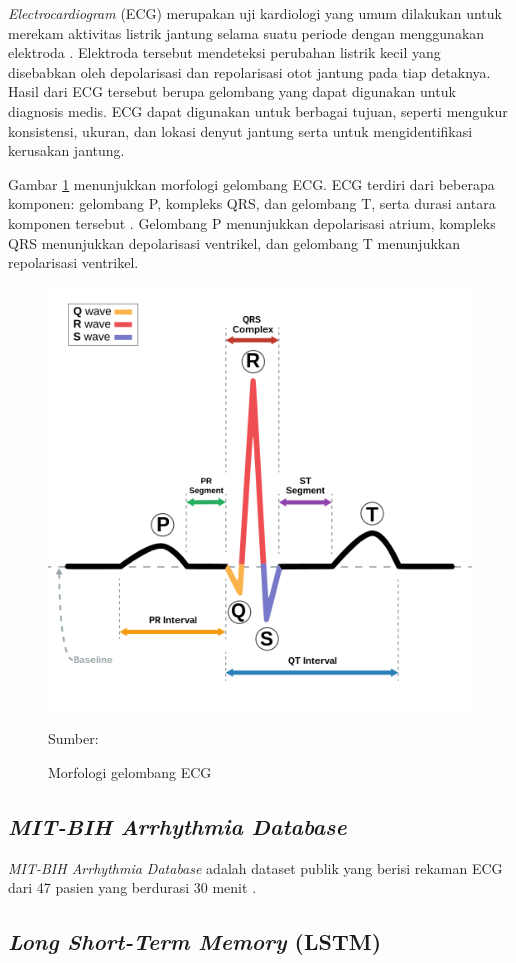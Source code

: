 \textit{Electrocardiogram} (ECG) merupakan uji kardiologi yang umum dilakukan untuk merekam aktivitas listrik jantung selama suatu periode dengan menggunakan elektroda \parencite{yoonDeepLearningbasedElectrocardiogram2019}.
Elektroda tersebut mendeteksi perubahan listrik kecil yang disebabkan oleh depolarisasi dan repolarisasi otot jantung pada tiap detaknya.
Hasil dari ECG tersebut berupa gelombang yang dapat digunakan untuk diagnosis medis.
ECG dapat digunakan untuk berbagai tujuan, seperti mengukur konsistensi, ukuran, dan lokasi denyut jantung serta untuk mengidentifikasi kerusakan jantung.


Gambar \ref{fig: ecg-morphology} menunjukkan morfologi gelombang ECG. ECG terdiri dari beberapa komponen: gelombang P, kompleks QRS, dan gelombang T, serta durasi antara komponen tersebut \parencite{anbalaganAnalysisVariousTechniques2023}.  Gelombang P menunjukkan depolarisasi atrium, kompleks QRS menunjukkan depolarisasi ventrikel, dan gelombang T menunjukkan repolarisasi ventrikel.

\begin{figure}[H]
  \centering
  \includegraphics[width=.5\linewidth]{img/ecg-morphology.png}
  \caption{Morfologi gelombang ECG}
  Sumber: \textcite{wiki:xxx}
  \label{fig: ecg-morphology}
\end{figure}

\subsection{\textit{MIT-BIH Arrhythmia Database}}
\label{subsec: landasan-mitbih}

\textit{MIT-BIH Arrhythmia Database} adalah dataset publik yang berisi rekaman ECG dari 47 pasien yang berdurasi 30 menit \parencite{moodyImpactMITBIHArrhythmia2001}.

\subsection{\textit{Long Short-Term Memory} (LSTM)}
\label{subsec: landasan-lstm}

